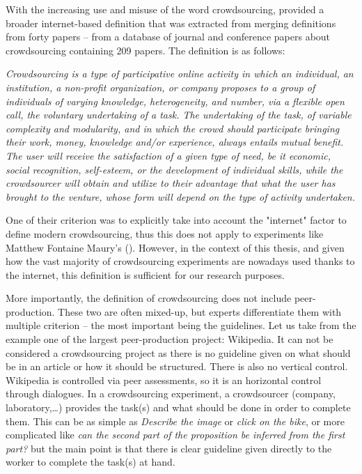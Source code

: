With the increasing use and misuse of the word crowdsourcing, \citet{estelles2012towards} provided a broader internet-based definition that was extracted from merging definitions from forty papers -- from a database of journal and conference papers about crowdsourcing containing 209 papers. The definition is as follows:
\begin{center}
\begin{minipage}{.75\textwidth}
\emph{
Crowdsourcing is a type of participative online activity in which an individual, an institution, a non-profit
organization, or company proposes to a group of individuals of varying knowledge, heterogeneity, and
number, via a flexible open call, the voluntary undertaking of a task. The undertaking of the task, of variable complexity and modularity, and in which the crowd should participate bringing their work, money, knowledge and/or experience, always entails mutual benefit. The user will receive the satisfaction of a given type of need, be it economic, social recognition, self-esteem, or the development of individual skills, while the crowdsourcer will obtain and utilize to their advantage that what the user has brought to the venture, whose form will depend on the type of activity undertaken.
}
\end{minipage}
\end{center}

One of their criterion was to explicitly take into account the "internet" factor to define modern crowdsourcing, thus this does not apply to experiments like Matthew Fontaine Maury's (). However, in the context of this thesis, and given how the vast majority of crowdsourcing experiments are nowadays used thanks to the internet, this definition is sufficient for our research purposes.

More importantly, the definition of crowdsourcing does not include peer-production.
These two are often mixed-up, but experts \citep{brabham2013crowdsourcing} differentiate them with multiple criterion -- the most important being the guidelines.
Let us take from \citet{brabham2013crowdsourcing} the example one of the largest peer-production project: Wikipedia.
It can not be considered a crowdsourcing project as there is no guideline given on what should be in an article or how it should be structured.
There is also no vertical control.
Wikipedia is controlled via peer assessments, so it is an horizontal control through dialogues.
In a crowdsourcing experiment, a crowdsourcer (company, laboratory,\dots) provides the task(s) and what should be done in order to complete them.
This can be as simple as \emph{Describe the image} or \emph{click on the bike}, or more complicated like \emph{can the second part of the proposition be inferred from the first part?} but the main point is that there is clear guideline given directly to the worker to complete the task(s) at hand.

